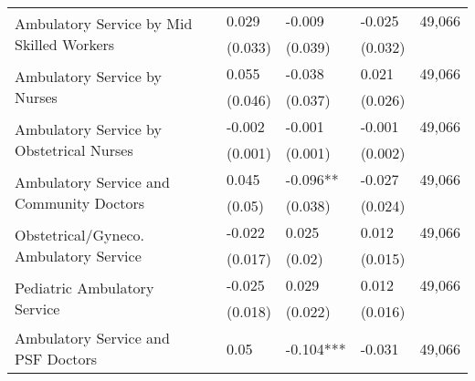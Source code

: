 \begin{table}[H]
\begin{footnotesize}
\begin{center}
{\begin{threeparttable}[b]
\begin{tabular}{rrrrrr}
    \multicolumn{1}{l}{\multirow{2}[0]{*}{Ambulatory Service by Mid Skilled Workers}} &       & \multicolumn{1}{l}{0.029} & \multicolumn{1}{l}{-0.009} & \multicolumn{1}{l}{-0.025} & \multicolumn{1}{c}{        49,066 } \\
          &       & \multicolumn{1}{l}{(0.033)} & \multicolumn{1}{l}{(0.039)} & \multicolumn{1}{l}{(0.032)} &  \\
    \multicolumn{1}{l}{\multirow{2}[0]{*}{Ambulatory Service by Nurses}} &       & \multicolumn{1}{l}{0.055} & \multicolumn{1}{l}{-0.038} & \multicolumn{1}{l}{0.021} & \multicolumn{1}{c}{        49,066 } \\
          &       & \multicolumn{1}{l}{(0.046)} & \multicolumn{1}{l}{(0.037)} & \multicolumn{1}{l}{(0.026)} &  \\
    \multicolumn{1}{l}{\multirow{2}[0]{*}{Ambulatory Service by Obstetrical Nurses}} &       & \multicolumn{1}{l}{-0.002} & \multicolumn{1}{l}{-0.001} & \multicolumn{1}{l}{-0.001} & \multicolumn{1}{c}{        49,066 } \\
          &       & \multicolumn{1}{l}{(0.001)} & \multicolumn{1}{l}{(0.001)} & \multicolumn{1}{l}{(0.002)} &  \\
    \multicolumn{1}{l}{\multirow{2}[0]{*}{Ambulatory Service and Community Doctors}} &       & \multicolumn{1}{l}{0.045} & \multicolumn{1}{l}{-0.096**} & \multicolumn{1}{l}{-0.027} & \multicolumn{1}{c}{        49,066 } \\
          &       & \multicolumn{1}{l}{(0.05)} & \multicolumn{1}{l}{(0.038)} & \multicolumn{1}{l}{(0.024)} &  \\
    \multicolumn{1}{l}{\multirow{2}[0]{*}{Obstetrical/Gyneco. Ambulatory Service}} &       & \multicolumn{1}{l}{-0.022} & \multicolumn{1}{l}{0.025} & \multicolumn{1}{l}{0.012} & \multicolumn{1}{c}{        49,066 } \\
          &       & \multicolumn{1}{l}{(0.017)} & \multicolumn{1}{l}{(0.02)} & \multicolumn{1}{l}{(0.015)} &  \\
    \multicolumn{1}{l}{\multirow{2}[0]{*}{Pediatric Ambulatory Service}} &       & \multicolumn{1}{l}{-0.025} & \multicolumn{1}{l}{0.029} & \multicolumn{1}{l}{0.012} & \multicolumn{1}{c}{        49,066 } \\
          &       & \multicolumn{1}{l}{(0.018)} & \multicolumn{1}{l}{(0.022)} & \multicolumn{1}{l}{(0.016)} &  \\
    \multicolumn{1}{l}{\multirow{2}[0]{*}{Ambulatory Service and PSF Doctors}} &       & \multicolumn{1}{l}{0.05} & \multicolumn{1}{l}{-0.104***} & \multicolumn{1}{l}{-0.031} & \multicolumn{1}{c}{        49,066 } \\

\end{tabular}
\end{threeparttable}}
\end{center}
\end{footnotesize}
\end{table}
